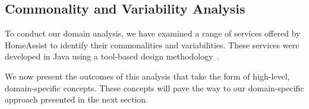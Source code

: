 

\subsection{Commonality and Variability Analysis}
To conduct our domain analysis, we have examined a range of services offered by HomeAssist to identify their commonalities and variabilities. These services were developed in Java using a tool-based design methodology~\cite{bertran2014diasuite,cassou2012toward}.

We now present the outcomes of this analysis that take the form of high-level, domain-specific concepts. These concepts will pave the way to our domain-specific approach presented in the next section.

